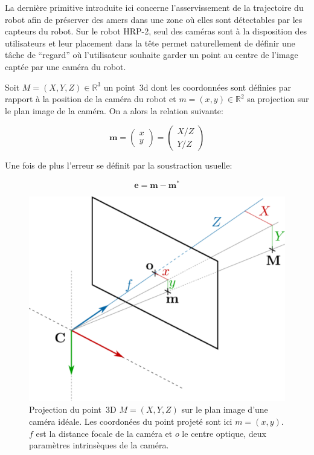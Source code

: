 La dernière primitive introduite ici concerne l'asservissement de la
trajectoire du robot afin de préserver des amers dans une zone où
elles sont détectables par les capteurs du robot. Sur le robot HRP-2,
seul des caméras sont à la disposition des utilisateurs et leur
placement dans la tête permet naturellement de définir une tâche de
``regard'' où l'utilisateur souhaite garder un point au centre de
l'image captée par une caméra du robot.

Soit \mbox{$M = (X, Y, Z) \in \mathbb{R}^3$} un point 3d dont les
coordonnées sont définies par rapport à la position de la caméra du
robot et \mbox{$m = (x, y) \in \mathbb{R}^2$} sa projection sur le
plan image de la caméra. On a alors la
relation suivante:

\begin{equation}
  \mathbf{m} = \left(
  \begin{array}{c}
    x\\
    y
  \end{array}
  \right) = \left(
  \begin{array}{c}
    X / Z\\
    Y / Z
  \end{array}
  \right)
\end{equation}


Une fois de plus l'erreur se définit par la soustraction usuelle:

\begin{equation}
  \mathbf{e} = \mathbf{m} - \mathbf{m}^*
\end{equation}

\begin{figure}
  \begin{center}
    \includegraphics[width=.95\linewidth]{src/chap3-primitive-mouvement/cameraProj.pdf}
  \end{center}
  \caption{Projection du point 3D $M = (X, Y, Z)$ sur le plan image
    d'une caméra idéale. Les coordonées du point projeté sont ici $m =
    (x, y)$. $f$ est la distance focale de la caméra et $o$ le centre
    optique, deux paramètres intrinsèques de la caméra.}
\end{figure}




